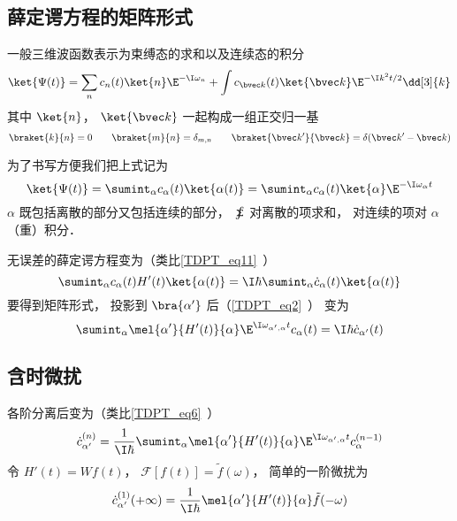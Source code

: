 

\subsection{薛定谔方程的矩阵形式}
一般三维波函数表示为束缚态的求和以及连续态的积分
\begin{equation}
\ket{\Psi(t)} = \sum_n c_n(t)\ket{n}\E^{-\I\omega_n} + \int c_{\bvec k}(t)\ket{\bvec k}\E^{-\I k^2 t/2} \dd[3]{k}
\end{equation}
其中 $\ket{n}$， $\ket{\bvec k}$ 一起构成一组正交归一基
\begin{equation}
\braket{k}{n} = 0 \qquad \braket{m}{n} = \delta_{m,n} \qquad \braket{\bvec k'}{\bvec k} = \delta(\bvec k' - \bvec k)
\end{equation}


为了书写方便我们把上式记为
\begin{equation}
\ket{\Psi(t)} = \sumint_\alpha c_\alpha(t) \ket{\alpha(t)} = \sumint_\alpha c_\alpha(t) \ket{\alpha}\E^{-\I\omega_\alpha t} 
\end{equation}
$\alpha$ 既包括离散的部分又包括连续的部分， $\sumint$ 对离散的项求和， 对连续的项对 $\alpha$ （重）积分．

无误差的薛定谔方程变为（类比\autoref{TDPT_eq11}~）
\begin{equation}
\sumint_\alpha c_\alpha(t) H'(t) \ket{\alpha(t)} = \I \hbar \sumint_\alpha \dot c_\alpha(t) \ket{\alpha(t)}
\end{equation}
要得到矩阵形式， 投影到 $\bra{\alpha'}$ 后（\autoref{TDPT_eq2}~） 变为
\begin{equation}
\sumint_\alpha \mel{\alpha'}{H'(t)}{\alpha} \E^{\I \omega_{\alpha',\alpha} t} c_\alpha(t)
= \I \hbar \dot c_{\alpha'} (t)
\end{equation}

\subsection{含时微扰}
各阶分离后变为（类比\autoref{TDPT_eq6}~）
\begin{equation}
\dot c_{\alpha'}^{(n)} = \frac{1}{\I\hbar} \sumint_\alpha \mel{\alpha'}{H'(t)}{\alpha} \E^{\I \omega_{\alpha',\alpha} t} c_{\alpha}^{(n-1)} 
\end{equation}
令 $H'(t) = W f(t)$， $\mathcal F[f(t)] = \tilde f(\omega)$， 简单的一阶微扰为
\begin{equation}
\dot c_{\alpha'}^{(1)}(+\infty) = \frac{1}{\I\hbar} \mel{\alpha'}{H'(t)}{\alpha} \tilde f(-\omega)
\end{equation}
